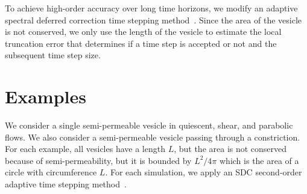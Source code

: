 \documentclass[9pt,twocolumn,twoside,lineno]{pnas-new}
\begin{document}
To achieve high-order accuracy over long time horizons, we modify an
adaptive spectral deferred correction time stepping
method~\cite{qua-bir2016}. Since the area of the vesicle is not
conserved, we only use the length of the vesicle to estimate the local
truncation error that determines if a time step is accepted or not and
the subsequent time step size.

\section*{Examples}
We consider a single semi-permeable vesicle in quiescent, shear, and
parabolic flows. We also consider a semi-permeable vesicle passing
through a constriction. For each example, all vesicles have a length
$L$, but the area is not conserved because of semi-permeability, but it
is bounded by $L^2/4\pi$ which is the area of a circle with
circumference $L$. For each simulation, we apply an SDC second-order
adaptive time stepping method~\cite{qua-bir2016}. 

\end{document}
